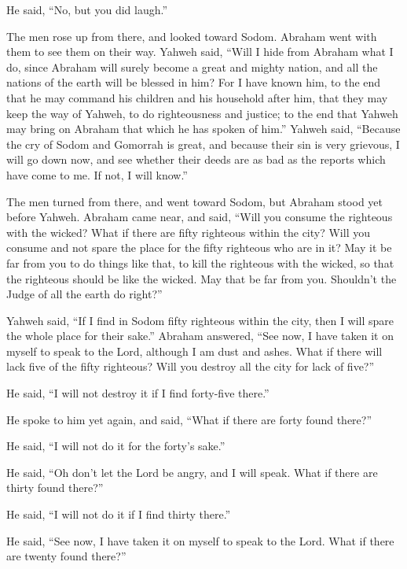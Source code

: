He said, ``No, but you did laugh.''

 The men rose up from there, and looked toward Sodom.
Abraham went with them to see them on their way.  Yahweh
said, ``Will I hide from Abraham what I do,  since Abraham
will surely become a great and mighty nation, and all the nations of the
earth will be blessed in him?  For I have known him, to the
end that he may command his children and his household after him, that
they may keep the way of Yahweh, to do righteousness and justice; to the
end that Yahweh may bring on Abraham that which he has spoken of him.''
 Yahweh said, ``Because the cry of Sodom and Gomorrah is
great, and because their sin is very grievous,  I will go
down now, and see whether their deeds are as bad as the reports which
have come to me. If not, I will know.''

 The men turned from there, and went toward Sodom, but
Abraham stood yet before Yahweh.  Abraham came near, and
said, ``Will you consume the righteous with the wicked? 
What if there are fifty righteous within the city? Will you consume and
not spare the place for the fifty righteous who are in it? 
May it be far from you to do things like that, to kill the righteous
with the wicked, so that the righteous should be like the wicked. May
that be far from you. Shouldn't the Judge of all the earth do right?''

 Yahweh said, ``If I find in Sodom fifty righteous within
the city, then I will spare the whole place for their sake.''
 Abraham answered, ``See now, I have taken it on myself to
speak to the Lord, although I am dust and ashes.  What if
there will lack five of the fifty righteous? Will you destroy all the
city for lack of five?''

He said, ``I will not destroy it if I find forty-five there.''

 He spoke to him yet again, and said, ``What if there are
forty found there?''

He said, ``I will not do it for the forty's sake.''

 He said, ``Oh don't let the Lord be angry, and I will
speak. What if there are thirty found there?''

He said, ``I will not do it if I find thirty there.''

 He said, ``See now, I have taken it on myself to speak to
the Lord. What if there are twenty found there?''

